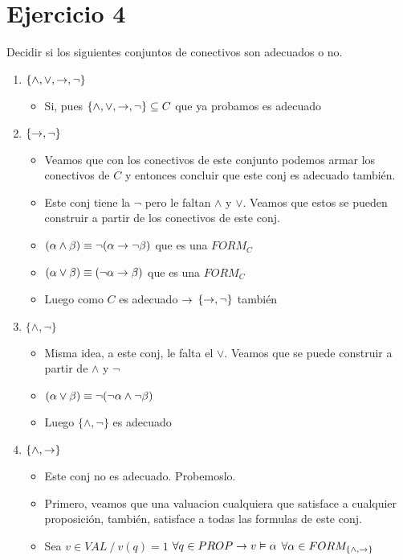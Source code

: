 \documentclass[14pt,a4paper,fleqn]{article}
\begin{document}
\section*{Ejercicio 4}
Decidir si los siguientes conjuntos de conectivos son adecuados o no.
\begin{enumerate}
	\item $\{ \wedge, \vee, \rightarrow, \neg  \}$
	\begin{itemize}
		\item Si, pues $\{ \wedge, \vee, \rightarrow, \neg \} \subseteq C$ que ya probamos es adecuado
	\end{itemize}
	\item $\{ \rightarrow, \neg \}$
	\begin{itemize}
		\item Veamos que con los conectivos de este conjunto podemos armar los conectivos de $C$ y entonces concluir que este conj es adecuado también.
		\item Este conj tiene la $\neg$ pero le faltan $\wedge$ y $\vee$. Veamos que estos se pueden construir a partir de los conectivos de este conj.
		\item $(\alpha \wedge \beta) \equiv \neg(\alpha \rightarrow \neg \beta)$ que es una $FORM_{C}$
		\item $(\alpha \vee \beta) \equiv (\neg\alpha \rightarrow \beta)$ que es una $FORM_{C}$
		\item Luego como $C$ es adecuado $\rightarrow$ $\{ \rightarrow, \neg \}$ también
	\end{itemize}	
	\item $\{ \wedge, \neg \}$
	\begin{itemize}
		\item Misma idea, a este conj, le falta el $\vee$. Veamos que se puede construir a partir de $\wedge$ y $\neg$
		\item $(\alpha \vee \beta) \equiv \neg(\neg \alpha \wedge \neg \beta)$
		\item Luego $\{ \wedge, \neg \}$ es adecuado
	\end{itemize}
	\item $\{ \wedge, \rightarrow \}$
	\begin{itemize}
		\item Este conj no es adecuado. Probemoslo.
		\item Primero, veamos que una valuacion cualquiera que satisface a cualquier proposición, también, satisface a todas las formulas de este conj.
		\item Sea $v \in VAL \: / \: v(q) = 1$ $\forall q \in PROP \rightarrow v \vDash \alpha$ $\forall \alpha\in FORM_{\{\wedge, \rightarrow \}}$

\end{itemize}
\end{enumerate}
\end{document}
